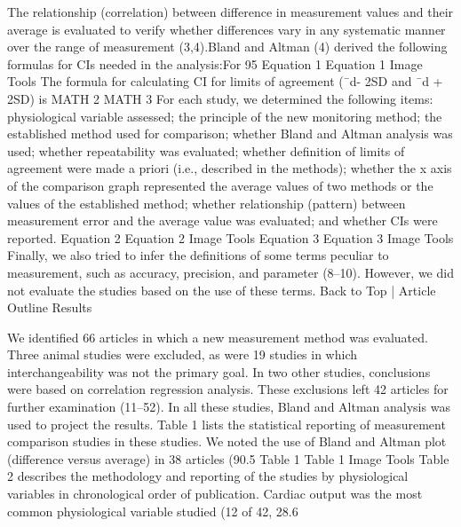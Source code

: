 \documentclass[]{article}
\begin{document}
The relationship (correlation) between difference in measurement values and their average is evaluated to verify whether differences vary in any systematic manner over the range of measurement (3,4).Bland and Altman (4) derived the following formulas for CIs needed in the analysis:For 95%
Equation 1
Equation 1
Image Tools
The formula for calculating CI for limits of agreement (¯d- 2SD and ¯d + 2SD) is MATH 2 MATH 3 For each study, we determined the following items: physiological variable assessed; the principle of the new monitoring method; the established method used for comparison; whether Bland and Altman analysis was used; whether repeatability was evaluated; whether definition of limits of agreement were made a priori (i.e., described in the methods); whether the x axis of the comparison graph represented the average values of two methods or the values of the established method; whether relationship (pattern) between measurement error and the average value was evaluated; and whether CIs were reported.
Equation 2
Equation 2
Image Tools	Equation 3
Equation 3
Image Tools
Finally, we also tried to infer the definitions of some terms peculiar to measurement, such as accuracy, precision, and parameter (8–10). However, we did not evaluate the studies based on the use of these terms.
Back to Top | Article Outline
Results

We identified 66 articles in which a new measurement method was evaluated. Three animal studies were excluded, as were 19 studies in which interchangeability was not the primary goal. In two other studies, conclusions were based on correlation regression analysis. These exclusions left 42 articles for further examination (11–52). In all these studies, Bland and Altman analysis was used to project the results. Table 1 lists the statistical reporting of measurement comparison studies in these studies. We noted the use of Bland and Altman plot (difference versus average) in 38 articles (90.5%
Table 1
Table 1
Image Tools
Table 2 describes the methodology and reporting of the studies by physiological variables in chronological order of publication. Cardiac output was the most common physiological variable studied (12 of 42, 28.6%
\end{document}
